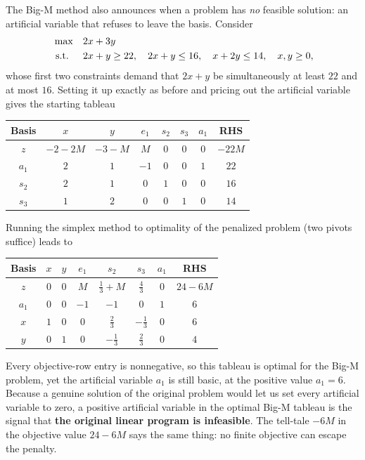 The Big-M method also announces when a problem has \emph{no} feasible solution: an artificial variable that refuses to leave the basis. Consider
\[
\begin{aligned}
\max\quad & 2x + 3y \\
\text{ s.t. }\quad & 2x + y \geq 22,\quad 2x + y \leq 16,\quad x + 2y \leq 14,\quad x,y\ge 0,
\end{aligned}
\]
whose first two constraints demand that $2x+y$ be simultaneously at least $22$ and at most $16$. Setting it up exactly as before and pricing out the artificial variable gives the starting tableau
\begin{center}
\renewcommand{\arraystretch}{1.3}\small\setlength{\tabcolsep}{4.5pt}
\begin{tabular}{c|cccccc|c}
\toprule
Basis & $x$ & $y$ & $e_1$ & $s_2$ & $s_3$ & $a_1$ & RHS\\
\midrule
$z$   & $-2-2M$ & $-3-M$ & $M$ & $0$ & $0$ & $0$ & $-22M$\\
\midrule
$a_1$ & $2$ & $1$ & $-1$ & $0$ & $0$ & $1$ & $22$\\
$s_2$ & $2$ & $1$ & $0$ & $1$ & $0$ & $0$ & $16$\\
$s_3$ & $1$ & $2$ & $0$ & $0$ & $1$ & $0$ & $14$\\
\bottomrule
\end{tabular}
\end{center}
Running the simplex method to optimality of the penalized problem (two pivots suffice) leads to
\begin{center}
\renewcommand{\arraystretch}{1.3}\small\setlength{\tabcolsep}{4.5pt}
\begin{tabular}{c|cccccc|c}
\toprule
Basis & $x$ & $y$ & $e_1$ & $s_2$ & $s_3$ & $a_1$ & RHS\\
\midrule
\rowcolor{algleave!15}$z$ & $0$ & $0$ & $M$ & $\tfrac13+M$ & $\tfrac43$ & $0$ & $24-6M$\\
\midrule
$a_1$ & $0$ & $0$ & $-1$ & $-1$ & $0$ & $1$ & $6$\\
$x$   & $1$ & $0$ & $0$ & $\tfrac23$ & $-\tfrac13$ & $0$ & $6$\\
$y$   & $0$ & $1$ & $0$ & $-\tfrac13$ & $\tfrac23$ & $0$ & $4$\\
\bottomrule
\end{tabular}
\end{center}
Every objective-row entry is nonnegative, so this tableau is optimal for the Big-M problem, yet the artificial variable $a_1$ is still basic, at the positive value $a_1 = 6$. Because a genuine solution of the original problem would let us set every artificial variable to zero, a positive artificial variable in the optimal Big-M tableau is the signal that \textbf{the original linear program is infeasible}. The tell-tale $-6M$ in the objective value $24-6M$ says the same thing: no finite objective can escape the penalty.

